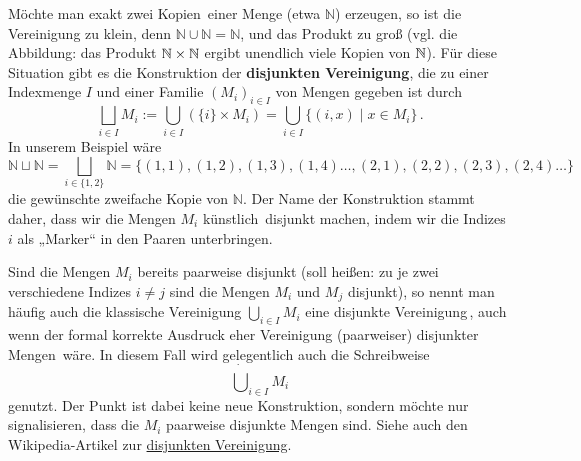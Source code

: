 \begin{bem}
	Möchte man exakt zwei \glqq Kopien\grqq\, einer Menge (etwa $\mathbb{N}$) erzeugen, so ist die Vereinigung zu klein, denn $\mathbb{N}\cup\mathbb{N}=\mathbb{N}$, und das Produkt zu groß (vgl. die Abbildung: das Produkt ${\mathbb N}\times{\mathbb N}$ ergibt unendlich viele Kopien von ${\mathbb N}$). Für diese Situation gibt es die Konstruktion der \textbf{disjunkten Vereinigung}, die zu einer Indexmenge $I$ und einer Familie $(M_i)_{i\in I}$ von Mengen gegeben ist durch
	\[ \bigsqcup_{i\in I} M_i := \bigcup_{i\in I}\left(\{i\}\times M_i\right) = \bigcup_{i\in I} \{ (i,x)\mid x\in M_i \} \,. \]
	In unserem Beispiel wäre 
	\[\mathbb{N}\sqcup\mathbb{N}=\bigsqcup_{i\in\{1,2\}}\mathbb{N}=\{(1,1),(1,2),(1,3),(1,4)\dots,(2,1),(2,2),(2,3),(2,4)\dots\}\]
	die gewünschte zweifache Kopie von $\mathbb{N}$. Der Name der Konstruktion stammt daher, dass wir die Mengen $M_i$ \glqq künstlich\grqq\, disjunkt machen, indem wir die Indizes $i$ als „Marker“ in den Paaren unterbringen.
	
	Sind die Mengen $M_i$ bereits paarweise disjunkt (soll heißen: zu je zwei verschiedene Indizes $i\neq j$ sind die Mengen $M_i$ und $M_j$ disjunkt), so nennt man häufig auch die klassische Vereinigung $\bigcup_{i\in I}M_i$ eine \glqq disjunkte Vereinigung\grqq\,, auch wenn der formal korrekte Ausdruck eher \glqq Vereinigung (paarweiser) disjunkter Mengen\grqq\, wäre. In diesem Fall wird gelegentlich auch die Schreibweise
		\[ \dot\bigcup_{i\in I}M_i \]
	genutzt. Der Punkt ist dabei keine neue Konstruktion, sondern möchte nur signalisieren, dass die $M_i$ paarweise disjunkte Mengen sind. Siehe auch den Wikipedia-Artikel zur \href{https://de.wikipedia.org/wiki/Disjunkte_Vereinigung}{disjunkten Vereinigung}.
\end{bem}

